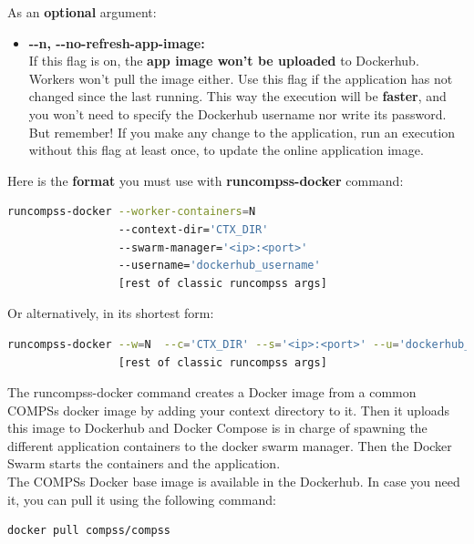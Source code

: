 As an \textbf{optional} argument:
\begin{itemize}
 \item { 
 \textbf{-{}-n, -{}-no-refresh-app-image:} \\
 If this flag is on, the \textbf{app image won't be uploaded }to Dockerhub.
 Workers won't pull the image either.
 Use this flag if the application has not changed since the last running.
 This way the execution will be \textbf{faster}, and you won't need to specify the Dockerhub username nor write its password.
 But remember! If you make any change to the application, run an execution without this flag at least once, 
 to update the online application image.
 }
\end{itemize}

Here is the \textbf{format} you must use with \textbf{runcompss-docker} command:
\begin{lstlisting}[language=bash]
runcompss-docker --worker-containers=N 
                 --context-dir='CTX_DIR'
                 --swarm-manager='<ip>:<port>'
                 --username='dockerhub_username'
                 [rest of classic runcompss args]
\end{lstlisting}           

Or alternatively, in its shortest form:
\begin{lstlisting}[language=bash]
runcompss-docker --w=N  --c='CTX_DIR' --s='<ip>:<port>' --u='dockerhub_username' 
                 [rest of classic runcompss args]
\end{lstlisting}        

The runcompss-docker command creates a Docker image from a common COMPSs docker image by adding your context directory to it. 
Then it uploads this image to Dockerhub and Docker Compose is in charge of spawning the different application containers to the docker swarm manager.
Then the Docker Swarm starts the containers and the application.
\\
The COMPSs Docker base image is available in the Dockerhub. In case you need it, you can pull it using the following command:
\begin{lstlisting}[language=bash]
docker pull compss/compss
\end{lstlisting}

\clearpage
